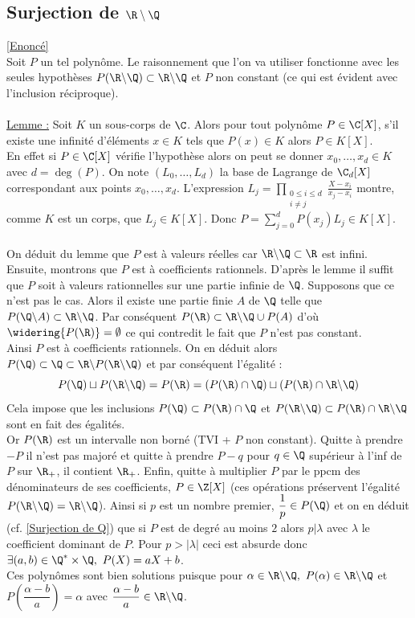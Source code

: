 \documentclass{book}
\begin{document}
	\subsection{Surjection de $\R\setminus\Q$ }
	\label{Surjection de R-Q corrigé}
	\textcolor{blue}{\hyperref[Surjection de R-Q]{[Enoncé]}}\\
	Soit $P$ un tel polynôme. Le raisonnement que l'on va utiliser fonctionne avec les seules hypothèses $P(\R\backslash\Q)\subset\R\backslash\Q$ et $P$ non constant (ce qui est évident avec l'inclusion réciproque).\\\\
	\underline{Lemme :} Soit $K$ un sous-corps de $\C$. Alors pour tout polynôme $P\in \C[X]$, s'il existe une infinité d'éléments $x\in K$ tels que $P(x)\in K$ alors $P\in K[X]$.\\
	En effet si $P\in \C[X]$ vérifie l'hypothèse alors on peut se donner $x_0,\dots,x_d\in K$ avec $d=\deg(P)$. On note $(L_0,\dots,L_d)$ la base de Lagrange de $\C_d[X]$ correspondant aux points $x_0,\dots,x_d$. L'expression $L_j=\displaystyle\prod_{\substack{0\leq i\leq d\\i\ne j}}\frac{X-x_i}{x_j-x_i}$ montre, comme $K$ est un corps, que $L_j\in K[X]$. Donc $P=\displaystyle\sum_{j=0}^dP(x_j)L_j\in K[X]$.\\\\
	On déduit du lemme que $P$ est à valeurs réelles car $\R\backslash\Q\subset \R$ est infini.\\
	Ensuite, montrons que $P$ est à coefficients rationnels. D'après le lemme il suffit que $P$ soit à valeurs rationnelles sur une partie infinie de $\Q$. Supposons que ce n'est pas le cas. Alors il existe une partie finie $A$ de $\Q$ telle que $P(\Q\backslash A)\subset \R\backslash\Q$. Par conséquent $P(\R)\subset\R\backslash\Q\cup P(A)$ d'où $\widering{P(\R)}=\emptyset$ ce qui contredit le fait que $P$ n'est pas constant.\\
	Ainsi $P$ est à coefficients rationnels. On en déduit alors $P(\Q)\subset\Q\subset\R\backslash P(\R\backslash\Q)$ et par conséquent l'égalité :
	$$P(\Q)\sqcup P(\R\backslash\Q)=P(\R)=(P(\R)\cap\Q)\sqcup(P(\R)\cap\R\backslash\Q)$$
	Cela impose que les inclusions $P(\Q)\subset P(\R)\cap\Q$ et $P(\R\backslash\Q)\subset P(\R)\cap\R\backslash\Q$ sont en fait des égalités.\\
	Or $P(\R)$ est un intervalle non borné (TVI + $P$ non constant). Quitte à prendre $-P$ il n'est pas majoré et quitte à prendre $P-q$ pour $q\in \Q$ supérieur à l'inf de $P$ sur $\R_+$, il contient $\R_+$. Enfin, quitte à multiplier $P$ par le ppcm des dénominateurs de ses coefficients, $P\in \Z[X]$ (ces opérations préservent l'égalité $P(\R\backslash\Q)=\R\backslash\Q$). Ainsi si $p$ est un nombre premier, $\dfrac{1}{p}\in P(\Q)$ et on en déduit (cf. \ref{Surjection de Q}) que si $P$ est de degré au moins $2$ alors $p|\lambda$ avec $\lambda$ le coefficient dominant de $P$. Pour $p>|\lambda|$ ceci est absurde donc $\exists (a,b)\in \Q^*\times \Q,\ P(X)=aX+b$.\\
	Ces polynômes sont bien solutions puisque pour $\alpha\in\R\backslash\Q,\ P(\alpha)\in\R\backslash\Q$ et $P\left(\dfrac{\alpha-b}{a}\right)=\alpha$ avec $\dfrac{\alpha-b}{a}\in \R\backslash\Q$.
	
\end{document}
